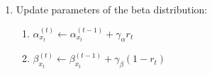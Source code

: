 \documentclass{article}
\begin{document}
\begin{section}
\begin{tcolorbox}[title= Thompson Sampling]
\begin{enumerate}
        \item Update parameters of the beta distribution:
        \begin{enumerate}
            \item $\alpha^{(t)}_{x_t} \leftarrow \alpha^{(t-1)}_{x_t} + \gamma_\alpha r_t$
            \item $\beta^{(t)}_{x_t} \leftarrow \beta^{(t-1)}_{x_t} + \gamma_\beta (1 - r_t)$
        \end{enumerate}
        
    \end{enumerate}
\end{tcolorbox}

\end{section}
\end{document}

